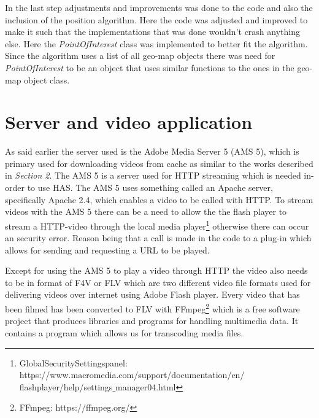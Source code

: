 In the last step adjustments and improvements was done to the code and also the inclusion of the position algorithm. Here the code was adjusted and improved to make it such that the implementations that was done wouldn't crash anything else. Here the \textit{PointOfInterest} class was implemented to better fit the algorithm. Since the algorithm uses a list of all geo-map objects there was need for \textit{PointOfInterest} to be an object that uses similar functions to the ones in the geo-map object class. 

\section{Server and video application}
\label{sec:server}

As said earlier the server used is the Adobe Media Server 5 (AMS 5), which is primary used for downloading videos from cache as similar to the works described in \textit{Section 2}. The AMS 5 is a server used for HTTP streaming which is needed in-order to use HAS. The AMS 5 uses something called an Apache server, specifically Apache 2.4, which enables a video to be called with HTTP. To stream videos with the AMS 5 there can be a need to allow the the flash player to stream a HTTP-video through the local media player\footnote{Global\:Security\:Settings\:panel: https://www.macromedia.com/support/documentation/en/\\flashplayer/help/settings$\_$manager04.html} otherwise there can occur an security error. Reason being that a call is made in the code to a plug-in which allows for sending and requesting a URL to be played.

Except for using the AMS 5 to play a video through HTTP the video also needs to be in format of F4V or FLV which are two different video file formats used for delivering videos over internet using Adobe Flash player. Every video that has been filmed has been converted to FLV with FFmpeg\footnote{FFmpeg: https://ffmpeg.org/} which is a free software project that produces libraries and programs for handling multimedia data. It contains a program which allows us for transcoding media files.

